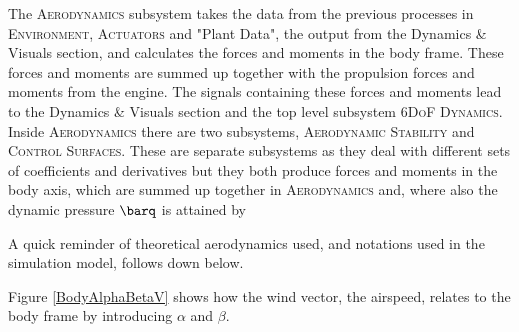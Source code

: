 The \textsc{Aerodynamics} subsystem takes the data from the previous processes in \textsc{Environment}, \textsc{Actuators} and "Plant Data", the output from the Dynamics \& Visuals section, and calculates the forces and moments in the body frame. These forces and moments are summed up together with the propulsion forces and moments from the engine. The signals containing these forces and moments lead to the Dynamics \& Visuals section and the top level subsystem \textsc{6DoF Dynamics}. Inside \textsc{Aerodynamics} there are two subsystems, \textsc{Aerodynamic Stability} and \textsc{Control Surfaces}. These are separate subsystems as they deal with different sets of coefficients and derivatives but they both produce forces and moments in the body axis, which are summed up together in \textsc{Aerodynamics} and, where also the dynamic pressure $\barq$ is attained by


A quick reminder of theoretical aerodynamics used, and notations used in the simulation model, follows down below.

Figure \ref{BodyAlphaBetaV} shows how the wind vector, the airspeed, relates to the body frame by introducing $\alpha$ and $\beta$.


\label{BodyAlphaBetaV}









